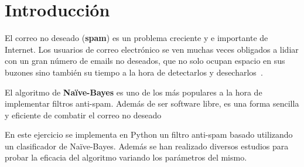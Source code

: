 \section{Introducción}

El correo no deseado (\textbf{spam}) es un problema creciente y e importante de
Internet. Los usuarios de correo electrónico se ven muchas veces obligados a
lidiar con un gran número de emails no deseados, que no solo ocupan espacio en
sus buzones sino también su tiempo a la hora de detectarlos y
desecharlos~\cite{sahami1998bayesian}.

El algoritmo de \textbf{Naïve-Bayes} es uno de los más populares a la hora de
implementar filtros anti-spam. Además de ser software libre, es una forma
sencilla y eficiente de combatir el correo no
deseado~\cite{mendez2007sistemas}~\cite{metsis2006spam}

En este ejercicio se implementa en Python un filtro anti-spam basado utilizando
un clasificador de Naïve-Bayes. Además se han realizado diversos estudios para
probar la eficacia del algoritmo variando los parámetros del mismo.
